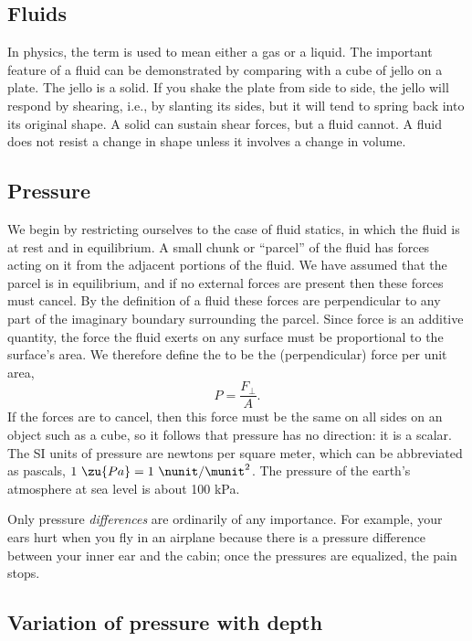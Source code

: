 \subsection{Fluids}

In physics, the term 
is used to mean either a gas or a liquid. The important
feature of a fluid can be demonstrated by comparing with a
cube of jello on a plate. The jello is a solid. If you shake
the plate from side to side, the jello will respond by
shearing, i.e., by slanting its sides, but it will tend to
spring back into its original shape. A solid can sustain
shear forces, but a fluid cannot. A fluid does not resist a
change in shape unless it involves a change in volume.

\subsection{Pressure}

We begin by restricting ourselves to the case of fluid statics,
in which the fluid is at rest and in equilibrium. A small
chunk or ``parcel'' of the fluid has forces acting on it
from the adjacent portions of the fluid. We have assumed that the parcel is
in equilibrium, and if no external forces are present then these forces must cancel.
By the definition
of a fluid these forces are perpendicular to any part of the imaginary
boundary surrounding the parcel. Since force is an additive
quantity, the force the fluid exerts on any surface must be proportional to the
surface's area. We therefore define the 
to be the (perpendicular) force per unit area,
\begin{equation}
  P = \frac{F_\perp}{A}.
\end{equation}
If the forces are to cancel, then this force must be the
same on all sides on an object such as a cube, so it follows that pressure
has no direction: it is a scalar.
The SI units of pressure are newtons per square meter, which can be
abbreviated as pascals, $1\ \zu{Pa}=1\ \nunit/\munit^2$. The pressure
of the earth's atmosphere at sea level is about 100 kPa.

Only pressure \emph{differences} are ordinarily of any importance.
For example, your ears hurt when you fly in an airplane because there
is a pressure difference between your inner ear and the cabin; once the
pressures are equalized, the pain stops.

\subsection{Variation of pressure with depth}


